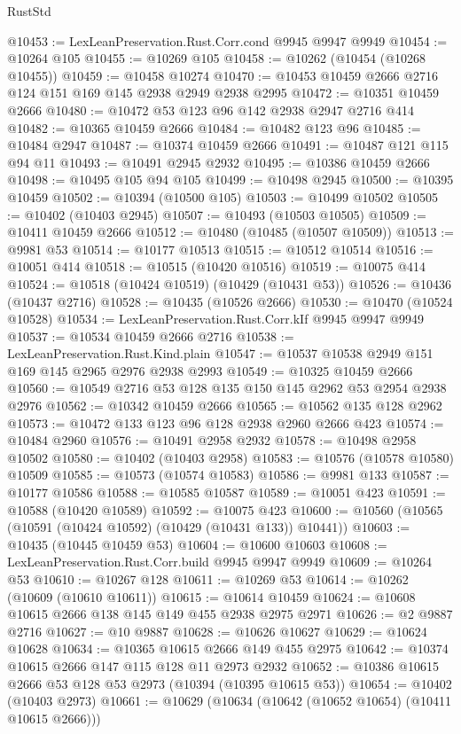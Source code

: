 \begin{lexlean}{RustStd}
\begin{coremodule}
{\begin{coremodule}
{{{{{{{{{{{{{{{{{{{{{{{{{{{{{{{{{{{{{{{{{{{{{{{{{{{{{{{{{{{{{{{{{{{{{{{{{{{{{{@10453 := LexLeanPreservation.Rust.Corr.cond @9945 @9947 @9949
@10454 := @10264 @105
@10455 := @10269 @105
@10458 := @10262 (@10454 (@10268 @10455))
@10459 := @10458 @10274
@10470 := @10453 @10459 @2666 @2716 @124 @151 @169 @145 @2938 @2949 @2938 @2995
@10472 := @10351 @10459 @2666
@10480 := @10472 @53 @123 @96 @142 @2938 @2947 @2716 @414
@10482 := @10365 @10459 @2666
@10484 := @10482 @123 @96
@10485 := @10484 @2947
@10487 := @10374 @10459 @2666
@10491 := @10487 @121 @115 @94 @11
@10493 := @10491 @2945 @2932
@10495 := @10386 @10459 @2666
@10498 := @10495 @105 @94 @105
@10499 := @10498 @2945
@10500 := @10395 @10459
@10502 := @10394 (@10500 @105)
@10503 := @10499 @10502
@10505 := @10402 (@10403 @2945)
@10507 := @10493 (@10503 @10505)
@10509 := @10411 @10459 @2666
@10512 := @10480 (@10485 (@10507 @10509))
@10513 := @9981 @53
@10514 := @10177 @10513
@10515 := @10512 @10514
@10516 := @10051 @414
@10518 := @10515 (@10420 @10516)
@10519 := @10075 @414
@10524 := @10518 (@10424 @10519) (@10429 (@10431 @53))
@10526 := @10436 (@10437 @2716)
@10528 := @10435 (@10526 @2666)
@10530 := @10470 (@10524 @10528)
@10534 := LexLeanPreservation.Rust.Corr.kIf @9945 @9947 @9949
@10537 := @10534 @10459 @2666 @2716
@10538 := LexLeanPreservation.Rust.Kind.plain
@10547 := @10537 @10538 @2949 @151 @169 @145 @2965 @2976 @2938 @2993
@10549 := @10325 @10459 @2666
@10560 := @10549 @2716 @53 @128 @135 @150 @145 @2962 @53 @2954 @2938 @2976
@10562 := @10342 @10459 @2666
@10565 := @10562 @135 @128 @2962
@10573 := @10472 @133 @123 @96 @128 @2938 @2960 @2666 @423
@10574 := @10484 @2960
@10576 := @10491 @2958 @2932
@10578 := @10498 @2958 @10502
@10580 := @10402 (@10403 @2958)
@10583 := @10576 (@10578 @10580) @10509
@10585 := @10573 (@10574 @10583)
@10586 := @9981 @133
@10587 := @10177 @10586
@10588 := @10585 @10587
@10589 := @10051 @423
@10591 := @10588 (@10420 @10589)
@10592 := @10075 @423
@10600 := @10560 (@10565 (@10591 (@10424 @10592) (@10429 (@10431 @133)) @10441))
@10603 := @10435 (@10445 @10459 @53)
@10604 := @10600 @10603
@10608 := LexLeanPreservation.Rust.Corr.build @9945 @9947 @9949
@10609 := @10264 @53
@10610 := @10267 @128
@10611 := @10269 @53
@10614 := @10262 (@10609 (@10610 @10611))
@10615 := @10614 @10459
@10624 := @10608 @10615 @2666 @138 @145 @149 @455 @2938 @2975 @2971
@10626 := @2 @9887 @2716
@10627 := @10 @9887
@10628 := @10626 @10627
@10629 := @10624 @10628
@10634 := @10365 @10615 @2666 @149 @455 @2975
@10642 := @10374 @10615 @2666 @147 @115 @128 @11 @2973 @2932
@10652 := @10386 @10615 @2666 @53 @128 @53 @2973 (@10394 (@10395 @10615 @53))
@10654 := @10402 (@10403 @2973)
@10661 := @10629 (@10634 (@10642 (@10652 @10654) (@10411 @10615 @2666)))
}}}}}}}}}}}}}}}}}}}}}}}}}}}}}}}}}}}}}}}}}}}}}}}}}}}}}}}}}}}}}}}}}}}}}}}}}}}}}}
\end{coremodule}}
\end{coremodule}
\end{lexlean}
